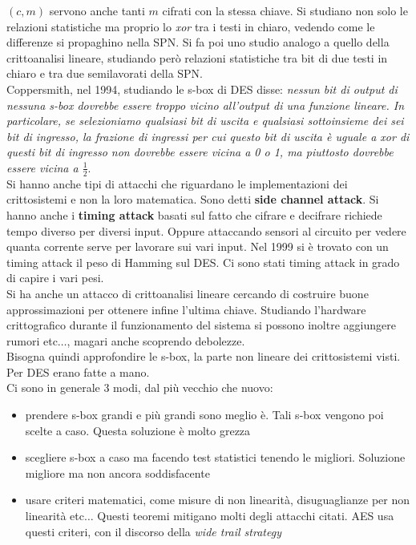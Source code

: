 \documentclass[a4paper,12pt, oneside]{book}
\begin{document}
$(c,m)$ servono anche tanti $m$ cifrati con la stessa chiave. Si studiano non
solo le relazioni statistiche ma proprio lo \textit{xor} tra i testi in chiaro,
vedendo come le differenze si propaghino nella SPN. Si fa poi uno studio analogo
a quello della crittoanalisi lineare, studiando però relazioni statistiche tra
bit di due testi in chiaro e tra due semilavorati della SPN.\\
Coppersmith, nel 1994, studiando le s-box di DES disse: \textit{nessun
  bit di 
output di nessuna s-box dovrebbe essere troppo vicino all'output di una funzione
lineare. In particolare, se selezioniamo qualsiasi bit di uscita e qualsiasi
sottoinsieme dei sei bit di ingresso, la frazione di ingressi per cui questo bit
di uscita è uguale a xor di questi bit di ingresso non dovrebbe essere vicina a
0 o 1, ma piuttosto dovrebbe essere vicina a $\frac{1}{2}$}.\\
Si hanno anche tipi di attacchi che riguardano le implementazioni dei
crittosistemi e non la loro matematica. Sono detti \textbf{side channel attack}.
Si hanno anche i \textbf{timing attack} basati sul fatto che cifrare e decifrare
richiede tempo diverso per diversi input. Oppure attaccando sensori al circuito
per vedere quanta corrente serve per lavorare sui vari input. Nel 1999 si è
trovato con un timing attack il peso di Hamming sul DES. Ci sono stati timing
attack in grado di capire i vari pesi.\\ Si ha anche un attacco
di crittoanalisi lineare cercando di costruire buone approssimazioni per
ottenere infine l'ultima chiave. Studiando l'hardware crittografico durante il
funzionamento del sistema si possono inoltre aggiungere rumori etc$\ldots$,
magari anche scoprendo debolezze.\\
Bisogna quindi approfondire le s-box, la parte non lineare dei crittosistemi
visti. Per DES erano fatte a mano.\\
Ci sono in generale 3 modi, dal più vecchio che nuovo:
\begin{itemize}
  \item prendere s-box grandi e più grandi sono meglio è. Tali s-box vengono poi
  scelte a caso. Questa soluzione è molto grezza
  \item scegliere s-box a caso ma facendo test statistici tenendo le
  migliori. Soluzione migliore ma non ancora soddisfacente
  \item usare criteri matematici, come misure di non linearità, disuguaglianze
  per non linearità etc$\ldots$ Questi teoremi mitigano molti degli attacchi
  citati. AES usa questi criteri, con il discorso della \textit{wide trail
    strategy} 
\end{itemize}
\end{document}
